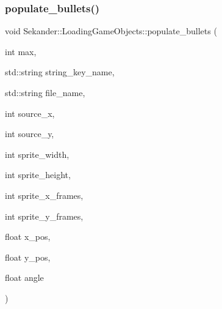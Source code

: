 \subsubsection{\texorpdfstring{populate\+\_\+bullets()}{populate\_bullets()}}
{\footnotesize\ttfamily void Sekander\+::\+Loading\+Game\+Objects\+::populate\+\_\+bullets (\begin{DoxyParamCaption}\item[{int}]{max,  }\item[{std\+::string}]{string\+\_\+key\+\_\+name,  }\item[{std\+::string}]{file\+\_\+name,  }\item[{int}]{source\+\_\+x,  }\item[{int}]{source\+\_\+y,  }\item[{int}]{sprite\+\_\+width,  }\item[{int}]{sprite\+\_\+height,  }\item[{int}]{sprite\+\_\+x\+\_\+frames,  }\item[{int}]{sprite\+\_\+y\+\_\+frames,  }\item[{float}]{x\+\_\+pos,  }\item[{float}]{y\+\_\+pos,  }\item[{float}]{angle }\end{DoxyParamCaption})\hspace{0.3cm}{\ttfamily [inline]}}

\mbox{\label{classSekander_1_1LoadingGameObjects_ae0c8e87b730092dd7129cb9edae07aca}} 
